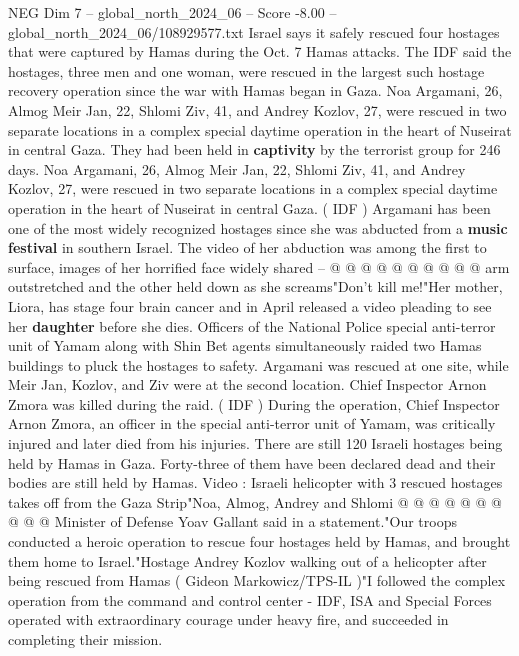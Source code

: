 \begin{textsample}{NEG Dim 7 – global\_north\_2024\_06 – Score -8.00 – global\_north\_2024\_06/108929577.txt}  \label{ex:f7_neg_134}
Israel says it safely rescued four hostages that were captured by Hamas during the Oct. 7 Hamas attacks.
The IDF said the hostages, three men and one woman, were rescued in the largest such hostage recovery operation since the war with Hamas began in Gaza.
Noa Argamani, 26, Almog Meir Jan, 22, Shlomi Ziv, 41, and Andrey Kozlov, 27, were rescued in two separate locations in a complex special daytime operation in the heart of Nuseirat in central Gaza.
They had been held in \textbf{captivity} by the terrorist group for 246 days.
Noa Argamani, 26, Almog Meir Jan, 22, Shlomi Ziv, 41, and Andrey Kozlov, 27, were rescued in two separate locations in a complex special daytime operation in the heart of Nuseirat in central Gaza. ( IDF ) Argamani has been one of the most widely recognized hostages since she was abducted from a \textbf{music} \textbf{festival} in southern Israel.
The video of her abduction was among the first to surface, images of her horrified face widely shared -- @ @ @ @ @ @ @ @ @ @ arm outstretched and the other held down as she screams"Don't kill me!"Her mother, Liora, has stage four brain cancer and in April released a video pleading to see her \textbf{daughter} before she dies.
Officers of the National Police special anti-terror unit of Yamam along with Shin Bet agents simultaneously raided two Hamas buildings to pluck the hostages to safety.
Argamani was rescued at one site, while Meir Jan, Kozlov, and Ziv were at the second location.
Chief Inspector Arnon Zmora was killed during the raid. ( IDF ) During the operation, Chief Inspector Arnon Zmora, an officer in the special anti-terror unit of Yamam, was critically injured and later died from his injuries.
There are still 120 Israeli hostages being held by Hamas in Gaza.
Forty-three of them have been declared dead and their bodies are still held by Hamas.
Video : Israeli helicopter with 3 rescued hostages takes off from the Gaza Strip"Noa, Almog, Andrey and Shlomi @ @ @ @ @ @ @ @ @ @ Minister of Defense Yoav Gallant said in a statement."Our troops conducted a heroic operation to rescue four hostages held by Hamas, and brought them home to Israel."Hostage Andrey Kozlov walking out of a helicopter after being rescued from Hamas ( Gideon Markowicz/TPS-IL )"I followed the complex operation from the command and control center - IDF, ISA and Special Forces operated with extraordinary courage under heavy fire, and succeeded in completing their mission.

\end{textsample}
